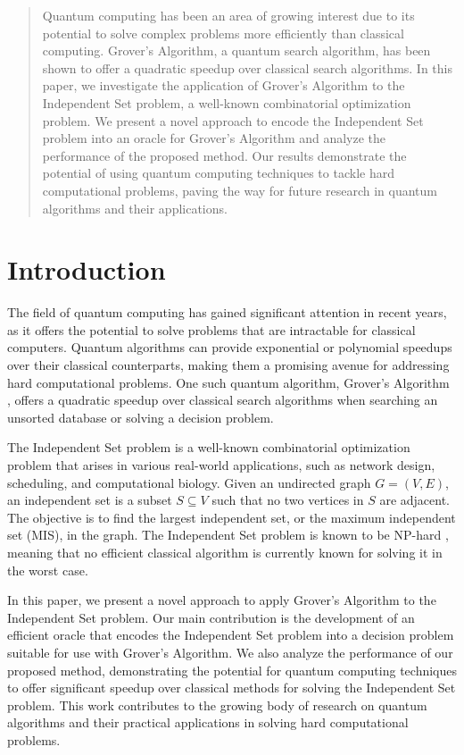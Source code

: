 \begin{abstract}
Quantum computing has been an area of growing interest due to its potential to solve complex problems more efficiently than classical computing. Grover's Algorithm, a quantum search algorithm, has been shown to offer a quadratic speedup over classical search algorithms. In this paper, we investigate the application of Grover's Algorithm to the Independent Set problem, a well-known combinatorial optimization problem. We present a novel approach to encode the Independent Set problem into an oracle for Grover's Algorithm and analyze the performance of the proposed method. Our results demonstrate the potential of using quantum computing techniques to tackle hard computational problems, paving the way for future research in quantum algorithms and their applications.
\end{abstract}

\section{Introduction}

The field of quantum computing has gained significant attention in recent years, as it offers the potential to solve problems that are intractable for classical computers. Quantum algorithms can provide exponential or polynomial speedups over their classical counterparts, making them a promising avenue for addressing hard computational problems. One such quantum algorithm, Grover's Algorithm \cite{grover1996}, offers a quadratic speedup over classical search algorithms when searching an unsorted database or solving a decision problem.

The Independent Set problem is a well-known combinatorial optimization problem that arises in various real-world applications, such as network design, scheduling, and computational biology. Given an undirected graph $G = (V, E)$, an independent set is a subset $S \subseteq V$ such that no two vertices in $S$ are adjacent. The objective is to find the largest independent set, or the maximum independent set (MIS), in the graph. The Independent Set problem is known to be NP-hard \cite{karp1972}, meaning that no efficient classical algorithm is currently known for solving it in the worst case.

In this paper, we present a novel approach to apply Grover's Algorithm to the Independent Set problem. Our main contribution is the development of an efficient oracle that encodes the Independent Set problem into a decision problem suitable for use with Grover's Algorithm. We also analyze the performance of our proposed method, demonstrating the potential for quantum computing techniques to offer significant speedup over classical methods for solving the Independent Set problem. This work contributes to the growing body of research on quantum algorithms and their practical applications in solving hard computational problems.

